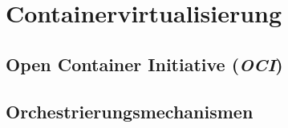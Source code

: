 \section{Containervirtualisierung}
\label{sec:containervirtualisierung}
\subsection{Open Container Initiative (\emph{OCI})}
\label{sec:open-container-initiative}
\subsection{Orchestrierungsmechanismen}
\label{sec:orchestrierungsmechanismen}
